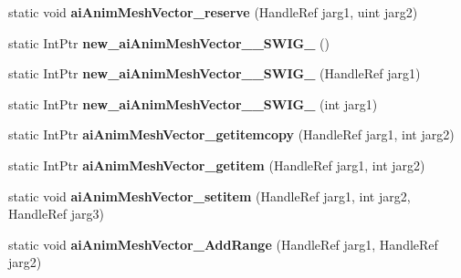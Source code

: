 \begin{DoxyCompactItemize}
\item 
\hypertarget{class_assimp_p_i_n_v_o_k_e_a79d0d50b2fab9c8b2e31e1c150558789}{static void {\bfseries ai\+Anim\+Mesh\+Vector\+\_\+reserve} (Handle\+Ref jarg1, uint jarg2)}\label{class_assimp_p_i_n_v_o_k_e_a79d0d50b2fab9c8b2e31e1c150558789}

\item 
\hypertarget{class_assimp_p_i_n_v_o_k_e_a1ad7ad9bf548815df16ef9ea620fa48e}{static Int\+Ptr {\bfseries new\+\_\+ai\+Anim\+Mesh\+Vector\+\_\+\+\_\+\+S\+W\+I\+G\+\_} ()}\label{class_assimp_p_i_n_v_o_k_e_a1ad7ad9bf548815df16ef9ea620fa48e}

\item 
\hypertarget{class_assimp_p_i_n_v_o_k_e_a8982d4cbc8d0d7f771e1650589fe13d2}{static Int\+Ptr {\bfseries new\+\_\+ai\+Anim\+Mesh\+Vector\+\_\+\+\_\+\+S\+W\+I\+G\+\_} (Handle\+Ref jarg1)}\label{class_assimp_p_i_n_v_o_k_e_a8982d4cbc8d0d7f771e1650589fe13d2}

\item 
\hypertarget{class_assimp_p_i_n_v_o_k_e_a076bbe811e25df6aa58dbccc1948c7a1}{static Int\+Ptr {\bfseries new\+\_\+ai\+Anim\+Mesh\+Vector\+\_\+\+\_\+\+S\+W\+I\+G\+\_} (int jarg1)}\label{class_assimp_p_i_n_v_o_k_e_a076bbe811e25df6aa58dbccc1948c7a1}

\item 
\hypertarget{class_assimp_p_i_n_v_o_k_e_a774555f7c553da657cc795f066fece7f}{static Int\+Ptr {\bfseries ai\+Anim\+Mesh\+Vector\+\_\+getitemcopy} (Handle\+Ref jarg1, int jarg2)}\label{class_assimp_p_i_n_v_o_k_e_a774555f7c553da657cc795f066fece7f}

\item 
\hypertarget{class_assimp_p_i_n_v_o_k_e_a7aac8ba062aae0ddb40d371c38196e0d}{static Int\+Ptr {\bfseries ai\+Anim\+Mesh\+Vector\+\_\+getitem} (Handle\+Ref jarg1, int jarg2)}\label{class_assimp_p_i_n_v_o_k_e_a7aac8ba062aae0ddb40d371c38196e0d}

\item 
\hypertarget{class_assimp_p_i_n_v_o_k_e_a708dc274c34c97a6acebb86beebc68f5}{static void {\bfseries ai\+Anim\+Mesh\+Vector\+\_\+setitem} (Handle\+Ref jarg1, int jarg2, Handle\+Ref jarg3)}\label{class_assimp_p_i_n_v_o_k_e_a708dc274c34c97a6acebb86beebc68f5}

\item 
\hypertarget{class_assimp_p_i_n_v_o_k_e_afbeab91a0d7500e479a33a8d2e25500b}{static void {\bfseries ai\+Anim\+Mesh\+Vector\+\_\+\+Add\+Range} (Handle\+Ref jarg1, Handle\+Ref jarg2)}\label{class_assimp_p_i_n_v_o_k_e_afbeab91a0d7500e479a33a8d2e25500b}


\end{DoxyCompactItemize}
